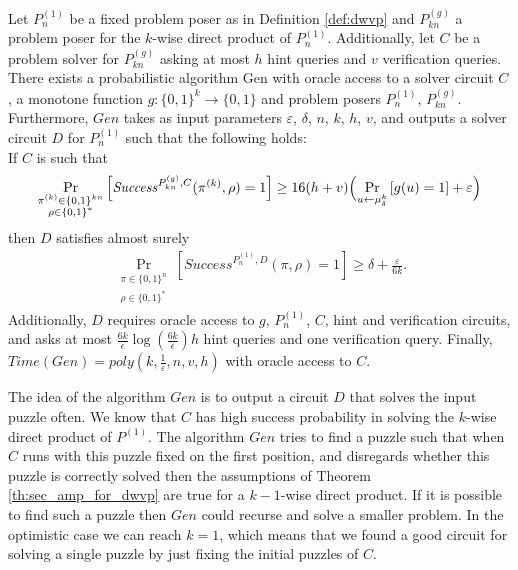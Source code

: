 \begin{theorem}
\label{th:sec_amp_for_dwvp}
Let $P_{n}^{(1)}$ be a fixed problem poser as in Definition \ref{def:dwvp}
and $P_{kn}^{(g)}$ a problem poser for the $k$-wise direct product of $P_{n}^{(1)}$.
Additionally, let $C$ be a problem solver for $P_{kn}^{(g)}$ asking at most $h$ hint queries and $v$ verification queries.
There exists a probabilistic algorithm Gen with oracle access to a solver circuit $C$,
a monotone function $g:\{0,1\}^k \rightarrow \{0,1\}$ and problem posers $P_{n}^{(1)}$, $P_{kn}^{(g)}$.
Furthermore, $\mathit{Gen}$ takes as input parameters $\varepsilon$, $\delta$, $n$, $k$, $h$, $v$, and outputs a solver circuit $D$ for $P_{n}^{(1)}$
such that the following holds: \\
If $C$ is such that
  \begin{align*}
    \underset{\substack{\pi^{(k)} \in \{0,1\}^{kn} \\ \rho \in \{0,1\}^{*}}}{\Pr}\left[\mathit{Success}^{P_{kn}^{(g)}, C}(\pi^{(k)}, \rho) = 1\right]
    \geq 16(h+v)\Bigl(\underset{u \leftarrow \mu_\delta^k}{\Pr}\left[g(u) = 1\right] + \varepsilon\Bigr)
  \end{align*}
then $D$ satisfies almost surely
  \begin{align*}
    \underset{\substack{\pi \in \{0,1\}^{n} \\ \rho \in \{0,1\}^{*}}}
    {\Pr}\left[\mathit{Success}^{P_{n}^{(1)},D}(\pi, \rho) = 1\right] \geq \delta + \frac{\varepsilon}{6k}.
  \end{align*}
Additionally, $D$ requires oracle access to $g$, $P_{n}^{(1)}$, $C$, hint and verification circuits,
and asks at most $\frac{6k}{\epsilon}\log\left(\frac{6k}{\epsilon}\right) h$ hint queries and one verification query.
Finally, $\mathit{Time}(\mathit{Gen}) = \mathit{poly}(k, \frac{1}{\varepsilon}, n, v, h)$ with oracle access to $C$.

\end{theorem}
%

The idea of the algorithm $Gen$ is to output a circuit $D$ that solves the input puzzle often.
We know that $C$ has high success probability in solving the $k$-wise direct product of $P^{(1)}$.
The algorithm $Gen$ tries to find a puzzle such that when $C$ runs with this puzzle fixed
on the first position, and disregards whether this puzzle is correctly solved
then the assumptions of Theorem \ref{th:sec_amp_for_dwvp} are true for a $k-1$-wise direct product.
If it is possible to find such a puzzle then $Gen$ could recurse and solve a smaller problem.
In the optimistic case we can reach $k=1$, which means that we found a good circuit for solving a single
puzzle by just fixing the initial puzzles of $C$.

